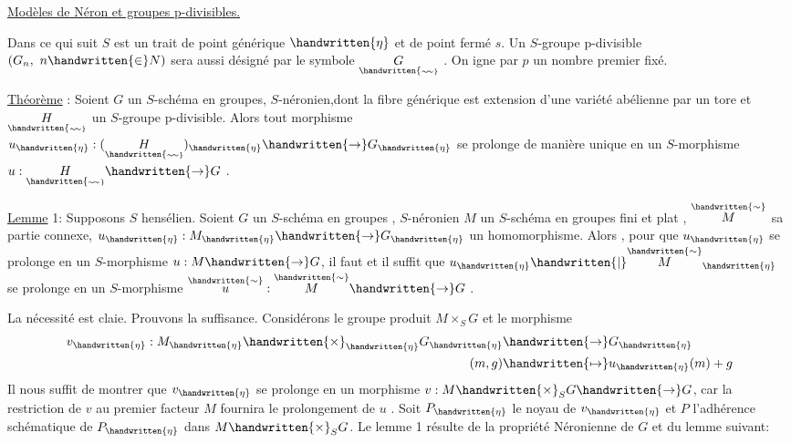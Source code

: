 \uline{Modèles de Néron et groupes p-divisibles.}

Dans ce qui suit $S$ est un trait de point générique $\handwritten{\eta}$ et de point
fermé $s$. Un $S$-groupe p-divisible $(G_n,\ n\handwritten{\in}N)$ sera aussi désigné par
le symbole $\underset{\handwritten{\scriptscriptstyle\sim\!\sim}}{G}$ . On igne par $p$ un nombre premier fixé.

\uline{Théorème} : Soient $G$ un $S$-schéma en groupes, $S$-néronien,\handwritten{[}dont la fibre générique est extension d'une variété abélienne par un tore\handwritten{]} et $\underset{\handwritten{\scriptscriptstyle\sim\!\sim}}{H}$ un $S$-groupe
p-divisible. Alors tout morphisme $u_{\handwritten{\eta}}:(\underset{\handwritten{\scriptscriptstyle\sim\!\sim}}{H})_{\handwritten{\eta}}\handwritten{\to} G_{\handwritten{\eta}}$ se prolonge de manière unique en un $S$-morphisme $u:\underset{\handwritten{\scriptscriptstyle\sim\!\sim}}{H}\handwritten{\to} G$ .

\uline{Lemme} 1: Supposons $S$ hensélien. Soient $G$ un $S$-schéma en groupes , $S$-néronien \handwritten{,} $M$ un $S$-schéma en groupes fini et plat , $\overset{\handwritten{\sim}}{M}$ sa partie connexe,
 $u_{\handwritten{\eta}}:M_{\handwritten{\eta}}\handwritten{\to} G_{\handwritten{\eta}}$ un homomorphisme. Alors , pour que $u_{\handwritten{\eta}}$ se prolonge en
un $S$-morphisme $u:M\handwritten{\to} G$, il faut et il suffit que $u_{\handwritten{\eta}}\handwritten{\mid}\overset{\handwritten{\sim}}{M}_{\handwritten{\eta}}$ se prolonge
en un $S$-morphisme $\overset{\handwritten{\sim}}{u}:\overset{\handwritten{\sim}}{M}\handwritten{\to} G$ .

La nécessité est claie. Prouvons la suffisance. Considérons le groupe
produit $M\times_S G$ et le morphisme
\[
\begin{aligned}
v_{\handwritten{\eta}}:M_{\handwritten{\eta}}\handwritten{\times}_{\handwritten{\eta}}G_{\handwritten{\eta}}&\handwritten{\to} G_{\handwritten{\eta}}\\
(m,g)&\handwritten{\mapsto} u_{\handwritten{\eta}}(m)+g
\end{aligned}
\]
Il nous suffit de montrer que $v_{\handwritten{\eta}}$ se prolonge en un morphisme $v:M\handwritten{\times}_S G\handwritten{\to} G$,
car la restriction de $v$ au premier facteur $M$ fournira le prolongement
de $u$ . Soit $P_{\handwritten{\eta}}$ le noyau de $v_{\handwritten{\eta}}$ et $P$ l'adhérence schématique de $P_{\handwritten{\eta}}$ dans
$M\handwritten{\times}_S G$. Le lemme 1 résulte de la propriété Néronienne de $G$ et du lemme suivant:

